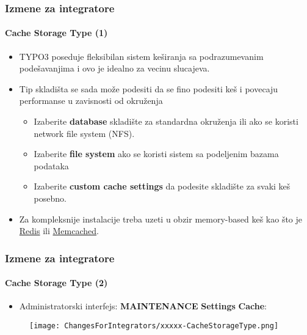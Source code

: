 \begin{frame}[fragile]
	\frametitle{Izmene za integratore}
	\framesubtitle{Cache Storage Type (1)}

	\begin{itemize}

		\item TYPO3 poseduje fleksibilan sistem keširanja sa podrazumevanim podešavanjima
			i ovo je idealno za vecinu slucajeva.

		\item Tip skladišta se sada može podesiti da se fino podesiti keš i povecaju
			performanse u zavisnosti od okruženja

			\begin{itemize}
				\item Izaberite \textbf{database} skladište za standardna okruženja ili ako se
				 	koristi network file system (NFS).
				\item Izaberite \textbf{file system} ako se koristi sistem sa podeljenim
					bazama podataka

				\item Izaberite \textbf{custom cache settings} da podesite skladište za svaki
					keš posebno.
			\end{itemize}

		\item Za kompleksnije instalacije treba uzeti u obzir memory-based keš kao što je
			\href{https://redis.io/}{Redis}
			ili
			\href{https://memcached.org/}{Memcached}.


	\end{itemize}

\end{frame}


\begin{frame}[fragile]
	\frametitle{Izmene za integratore}
	\framesubtitle{Cache Storage Type (2)}

	\begin{itemize}

		\item Administratorski interfejs: \textbf{MAINTENANCE} \hspace{0.1cm}\textbf{Settings} \hspace{0.1cm}\textbf{Cache}:
		\end{itemize}

	\begin{figure}
		\texttt{[image: ChangesForIntegrators/xxxxx-CacheStorageType.png]}
	\end{figure}

\end{frame}

